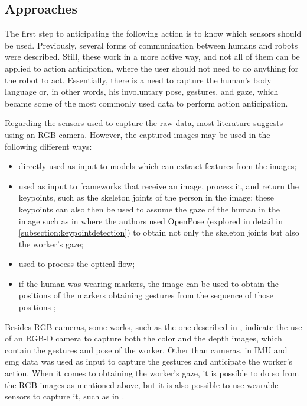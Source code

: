 \subsection{Approaches}

The first step to anticipating the following action is to know which sensors should be used. Previously, several forms of communication between humans and robots were described. Still, these work in a more active way, and not all of them can be applied to action anticipation, where the user should not need to do anything for the robot to act. Essentially, there is a need to capture the human's body language or, in other words, his involuntary pose, gestures, and gaze, which became some of the most commonly used data to perform action anticipation.

Regarding the sensors used to capture the raw data, most literature suggests using an RGB camera. However, the captured images may be used in the following different ways:
\begin{itemize}
\item directly used as input to models which can extract features from the images;

\item used as input to frameworks that receive an image, process it, and return the keypoints, such as the skeleton joints of the person in the image; these keypoints can also then be used to assume the gaze of the human in the image such as in \textcite{Canuto2021} where the authors used OpenPose (explored in detail in \autoref{subsection:keypointdetection}) to obtain not only the skeleton joints but also the worker's gaze;

\item used to process the optical flow\cite{Gammulle2019, Wu2021, Rodriguez2019, Furnari2021};

\item if the human was wearing markers, the image can be used to obtain the positions of the markers obtaining gestures from the sequence of those positions \cite{Maeda2016};
\end{itemize}

Besides RGB cameras, some works, such as the one described in \textcite{Moutinho2023}, indicate the use of an RGB-D camera to capture both the color and the depth images, which contain the gestures and pose of the worker. Other than cameras, in \textcite{Tortora2019} IMU and \acs{emg} data was used as input to capture the gestures and anticipate the worker's action. When it comes to obtaining the worker's gaze, it is possible to do so from the RGB images as mentioned above, but it is also possible to use wearable sensors to capture it, such as in \textcite{Schydlo2018}.

